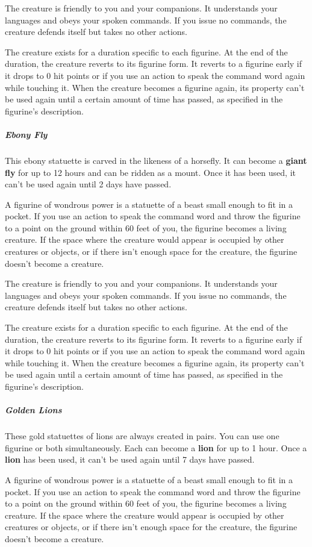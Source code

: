 \documentclass[10pt,a4paper,twoside,bg=print,twocolumn,openany,nodeprecatedcode]{dndbook}
\begin{document}
The creature is friendly to you and your companions. It understands your languages and obeys your spoken commands. If you issue no commands, the creature defends itself but takes no other actions.

The creature exists for a duration specific to each figurine. At the end of the duration, the creature reverts to its figurine form. It reverts to a figurine early if it drops to 0 hit points or if you use an action to speak the command word again while touching it. When the creature becomes a figurine again, its property can't be used again until a certain amount of time has passed, as specified in the figurine's description.

\subparagraph{Ebony Fly}
This ebony statuette is carved in the likeness of a horsefly. It can become a \textbf{giant fly} for up to 12 hours and can be ridden as a mount. Once it has been used, it can't be used again until 2 days have passed.

A figurine of wondrous power is a statuette of a beast small enough to fit in a pocket. If you use an action to speak the command word and throw the figurine to a point on the ground within 60 feet of you, the figurine becomes a living creature. If the space where the creature would appear is occupied by other creatures or objects, or if there isn't enough space for the creature, the figurine doesn't become a creature.

The creature is friendly to you and your companions. It understands your languages and obeys your spoken commands. If you issue no commands, the creature defends itself but takes no other actions.

The creature exists for a duration specific to each figurine. At the end of the duration, the creature reverts to its figurine form. It reverts to a figurine early if it drops to 0 hit points or if you use an action to speak the command word again while touching it. When the creature becomes a figurine again, its property can't be used again until a certain amount of time has passed, as specified in the figurine's description.

\subparagraph{Golden Lions}
These gold statuettes of lions are always created in pairs. You can use one figurine or both simultaneously. Each can become a \textbf{lion} for up to 1 hour. Once a \textbf{lion} has been used, it can't be used again until 7 days have passed.

A figurine of wondrous power is a statuette of a beast small enough to fit in a pocket. If you use an action to speak the command word and throw the figurine to a point on the ground within 60 feet of you, the figurine becomes a living creature. If the space where the creature would appear is occupied by other creatures or objects, or if there isn't enough space for the creature, the figurine doesn't become a creature.
\end{document}
